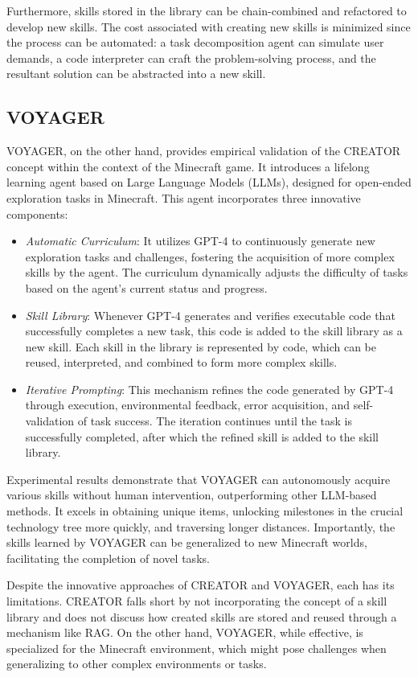 Furthermore, skills stored in the library can be chain-combined and refactored to develop new skills. The cost associated with creating new skills is minimized since the process can be automated: a task decomposition agent can simulate user demands, a code interpreter can craft the problem-solving process, and the resultant solution can be abstracted into a new skill.

\subsection{VOYAGER}

VOYAGER, on the other hand, provides empirical validation of the CREATOR concept within the context of the Minecraft game.
It introduces a lifelong learning agent based on Large Language Models (LLMs), designed for open-ended exploration tasks in Minecraft. This agent incorporates three innovative components:
\begin{itemize}
    \item \textit{Automatic Curriculum}: It utilizes GPT-4 to continuously generate new exploration tasks and challenges, fostering the acquisition of more complex skills by the agent. The curriculum dynamically adjusts the difficulty of tasks based on the agent’s current status and progress.
    \item \textit{Skill Library}: Whenever GPT-4 generates and verifies executable code that successfully completes a new task, this code is added to the skill library as a new skill. Each skill in the library is represented by code, which can be reused, interpreted, and combined to form more complex skills.
    \item \textit{Iterative Prompting}: This mechanism refines the code generated by GPT-4 through execution, environmental feedback, error acquisition, and self-validation of task success. The iteration continues until the task is successfully completed, after which the refined skill is added to the skill library.
\end{itemize}

Experimental results demonstrate that VOYAGER can autonomously acquire various skills without human intervention, outperforming other LLM-based methods. It excels in obtaining unique items, unlocking milestones in the crucial technology tree more quickly, and traversing longer distances. Importantly, the skills learned by VOYAGER can be generalized to new Minecraft worlds, facilitating the completion of novel tasks.

Despite the innovative approaches of CREATOR and VOYAGER, each has its limitations. CREATOR falls short by not incorporating the concept of a skill library and does not discuss how created skills are stored and reused through a mechanism like RAG. On the other hand, VOYAGER, while effective, is specialized for the Minecraft environment, which might pose challenges when generalizing to other complex environments or tasks.

